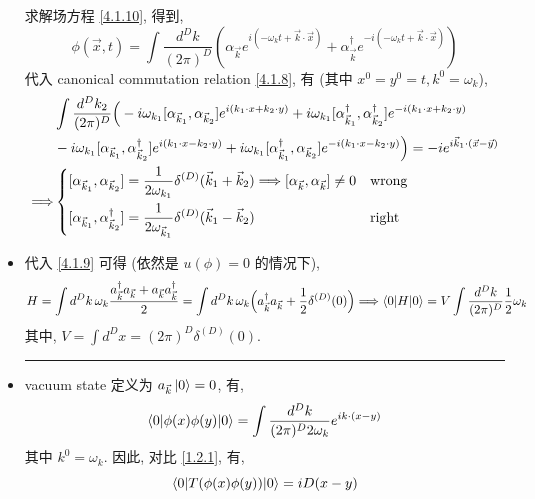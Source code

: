 \begin{itemize}
	\begin{tcolorbox}[title=calculation:]
		求解场方程 \eqref{4.1.10}, 得到,
		\begin{equation}
			\phi(\vec{x}, t) = \int \frac{d^D k}{(2 \pi)^D} (\alpha_{\vec{k}} e^{i (- \omega_k t + \vec{k} \cdot \vec{x})} + \alpha^\dag_{\vec{k}} e^{- i (- \omega_k t + \vec{k} \cdot \vec{x})})
		\end{equation}
		代入 canonical commutation relation \eqref{4.1.8}, 有 (其中 $x^0 = y^0 = t, k^0 = \omega_k$),
		\begin{align}
			& \int \frac{d^D k_2}{(2 \pi)^D} \Big( - i \omega_{k_1} [\alpha_{\vec{k}_1}, \alpha_{\vec{k}_2}] e^{i (k_1 \cdot x + k_2 \cdot y)} + i \omega_{k_1} [\alpha^\dag_{\vec{k}_1}, \alpha^\dag_{\vec{k}_2}] e^{- i (k_1 \cdot x + k_2 \cdot y)} \notag \\
			& - i \omega_{k_1} [\alpha_{\vec{k}_1}, \alpha^\dag_{\vec{k}_2}] e^{i (k_1 \cdot x - k_2 \cdot y)} + i \omega_{k_1} [\alpha^\dag_{\vec{k}_1}, \alpha_{\vec{k}_2}] e^{- i (k_1 \cdot x - k_2 \cdot y)} \Big) = - i e^{i \vec{k}_1 \cdot (\vec{x} - \vec{y})} \notag \\
			\Longrightarrow & \begin{dcases}
				[\alpha_{\vec{k}_1}, \alpha_{\vec{k}_2}] = \frac{1}{2 \omega_{k_1}} \delta^{(D)}(\vec{k}_1 + \vec{k}_2) \Longrightarrow [\alpha_{\vec{k}}, \alpha_{\vec{k}}] \neq 0 & \text{wrong} \\
				[\alpha_{\vec{k}_1}, \alpha^\dag_{\vec{k}_2}] = \frac{1}{2 \omega_{\vec{k}_1}} \delta^{(D)}(\vec{k}_1 - \vec{k}_2) & \text{right}
			\end{dcases}
		\end{align}
	\end{tcolorbox}
	
	\item 代入 \eqref{4.1.9} 可得 (依然是 $u(\phi) = 0$ 的情况下),
	\begin{equation} \label{4.1.15}
		H = \int d^D k \, \omega_k \frac{a^\dag_{\vec{k}} a_{\vec{k}} + a_{\vec{k}} a^\dag_{\vec{k}}}{2} = \int d^D k \, \omega_k \Big( a^\dag_{\vec{k}} a_{\vec{k}} + \frac{1}{2} \delta^{(D)}(0) \Big) \Longrightarrow \braket{0 | H | 0} = V \int \frac{d^D k}{(2 \pi)^D} \frac{1}{2} \omega_k
	\end{equation}
	其中, $V = \int d^D x = (2 \pi)^D \delta^{(D)}(0)$.
	
	\noindent\rule[0.5ex]{\linewidth}{0.5pt} %
	
	\item vacuum state 定义为 $a_{\vec{k}} \ket{0} = 0$, 有,
	\begin{equation}
		\braket{0 | \phi(x) \phi(y) | 0} = \int \frac{d^D k}{(2 \pi)^D 2 \omega_k} e^{i k \cdot (x - y)}
	\end{equation}
	其中 $k^0 = \omega_k$. 因此, 对比 \eqref{1.2.1}, 有,
	\begin{equation}
		\braket{0 | T(\phi(x) \phi(y)) | 0} = i D(x - y)
	\end{equation}
\end{itemize}

